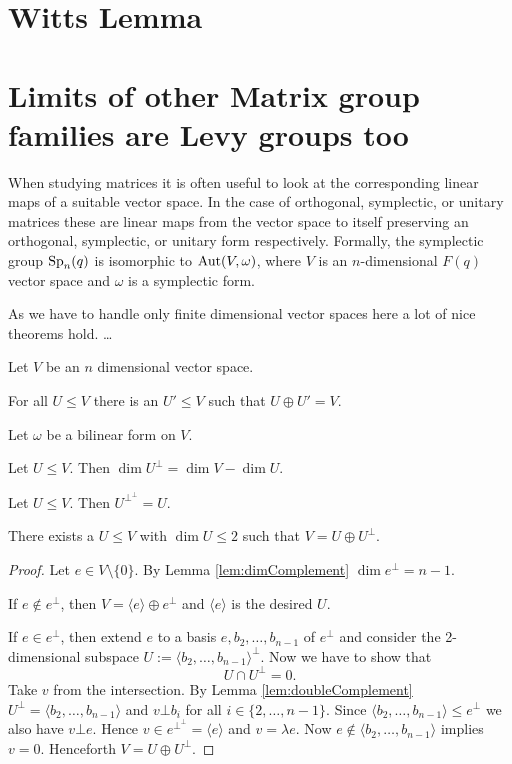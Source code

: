 \section{Witts Lemma}

\section{Limits of other Matrix group families are Levy groups too}
When studying matrices it is often useful to look at the corresponding linear maps of a suitable vector space. In the case of orthogonal, symplectic, or unitary matrices these are linear maps from the vector space to itself preserving an orthogonal, symplectic, or unitary form respectively. Formally, the symplectic group $\operatorname{Sp}_n(q)$ is isomorphic to $\operatorname{Aut}(V,\omega)$, where $V$ is an $n$-dimensional $F(q)$ vector space and $\omega$ is a symplectic form.

As we have to handle only finite dimensional vector spaces here a lot of nice theorems hold. \dots

Let $V$ be an $n$ dimensional vector space.%
\begin{lemma}\label{lem:complementExists}
For all $U\leq V$ there is an $U'\leq V$ such that $U\oplus U'=V$.
\end{lemma}


Let $\omega$ be a bilinear form on $V$.

\begin{lemma}\label{lem:dimComplement}
Let $U\leq V$. Then $\dim U^\bot= \dim V-\dim U$.
\end{lemma}
\begin{lemma}\label{lem:doubleComplement}
Let $U\leq V$. Then $U^{\bot^\bot}=U$.
\end{lemma}

\begin{lemma}\label{lem:decompositionComplement}
There exists a $U\leq V$ with $\dim U\leq 2$ such that $V=U\oplus U^\bot$.
\end{lemma}
\begin{proof}
Let $e\in V\setminus\{0\}$. By Lemma \ref{lem:dimComplement} $\dim e^\bot= n-1$. %

If $e\notin e^\bot$, then $V=\langle e\rangle\oplus e^\bot$ and $\langle e\rangle$ is the desired $U$.

If $e\in e^\bot$, then extend $e$ to a basis $e,b_2,\dots,b_{n-1}$ of $e^\bot$ and consider the 2-dimensional subspace $U:=\langle b_2,\dots,b_{n-1}\rangle^\bot$. Now we have to show that \[U\cap U^\bot=0.\]
Take $v$ from the intersection. By Lemma \ref{lem:doubleComplement} $U^\bot=\langle b_2,\dots,b_{n-1}\rangle$ and $v\bot b_i$ for all $i\in\{2,\dots,n-1\}$. Since $\langle b_2,\dots,b_{n-1}\rangle\leq e^\bot$ we also have $v\bot e$. Hence $v\in e^{\bot^\bot}=\langle e\rangle$ and $v=\lambda e$. Now $e\notin \langle b_2,\dots,b_{n-1}\rangle$ implies $v=0$. Henceforth $V=U\oplus U^\bot$.
\end{proof}


